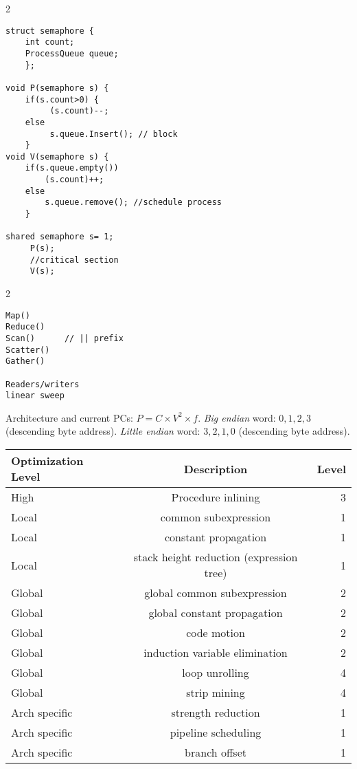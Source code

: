 \begin{multicols} {2} {
\begin{verbatim}
struct semaphore {
    int count;
    ProcessQueue queue;
    };

void P(semaphore s) {
    if(s.count>0) {
         (s.count)--;
    else
         s.queue.Insert(); // block
    }
void V(semaphore s) {
    if(s.queue.empty())
        (s.count)++;
    else
        s.queue.remove(); //schedule process
    }

shared semaphore s= 1;
     P(s);
     //critical section
     V(s);
\end{verbatim}
}
\end{multicols}
\begin{multicols} {2} {
\begin{verbatim}
Map()
Reduce()
Scan()      // || prefix
Scatter()
Gather()

Readers/writers
linear sweep

\end{verbatim}
}
\end{multicols}
Architecture and current PCs:
$P= C \times V^2 \times f$.  
\emph{Big endian} word: $0, 1, 2, 3$ (descending byte address).
\emph{Little endian} word: $3, 2, 1, 0$ (descending byte address).
\begin{center}
\begin{tabular} {|l|c|r|}
\hline
{\bf Optimization Level} & {\bf Description} & {\bf Level}\\
\hline
High & Procedure inlining & 3\\
Local & common subexpression & 1\\
Local & constant propagation & 1\\
Local & stack height reduction (expression tree) & 1\\
Global & global common subexpression & 2\\
Global & global constant propagation & 2\\
Global & code motion & 2\\
Global & induction variable elimination & 2\\
Global & loop unrolling & 4\\
Global & strip mining & 4\\
Arch specific & strength reduction & 1\\
Arch specific & pipeline scheduling & 1\\
Arch specific & branch offset & 1\\
\hline
\end{tabular}
\end{center}
